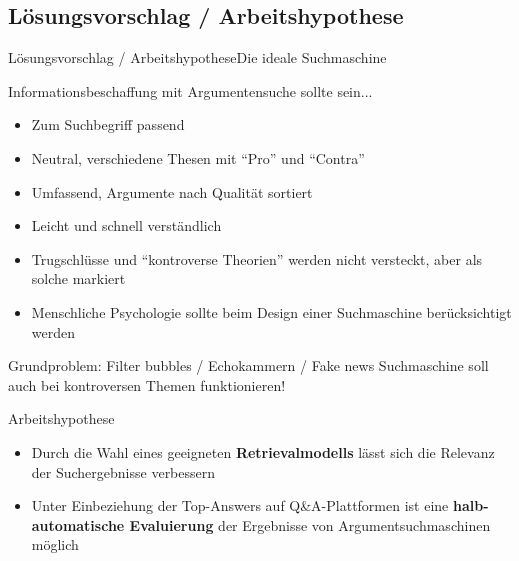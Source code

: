 \documentclass{beamer}
\begin{document}
	\subsection{Lösungsvorschlag / Arbeitshypothese}
	\begin{frame}{Lösungsvorschlag / Arbeitshypothese}{Die ideale Suchmaschine}
		\begin{block}{Informationsbeschaffung mit Argumentensuche sollte sein...}
			\begin{itemize}
				\item Zum Suchbegriff passend
				\item Neutral, verschiedene Thesen mit ``Pro'' und ``Contra''
				\item Umfassend, Argumente nach Qualität sortiert
				\item Leicht und schnell verständlich
				\item Trugschlüsse und ``kontroverse Theorien'' werden nicht versteckt, aber als solche markiert
				\item Menschliche Psychologie sollte beim Design einer Suchmaschine berücksichtigt werden
			\end{itemize}
		\end{block}
		\begin{block}{Grundproblem: Filter bubbles / Echokammern / Fake news}
			Suchmaschine soll auch bei kontroversen Themen funktionieren!
		\end{block}
	\end{frame}

	\begin{frame}{Arbeitshypothese\only<2->{n}}
		\begin{itemize}[<+->]
			\item Durch die Wahl eines geeigneten \textbf{Retrievalmodells} lässt sich die Relevanz der Suchergebnisse verbessern
			\item Unter Einbeziehung der Top-Answers auf Q\&A-Plattformen ist eine \textbf{halb-automatische Evaluierung} der Ergebnisse von Argumentsuchmaschinen möglich
		\end{itemize}
	\end{frame}
\end{document}
